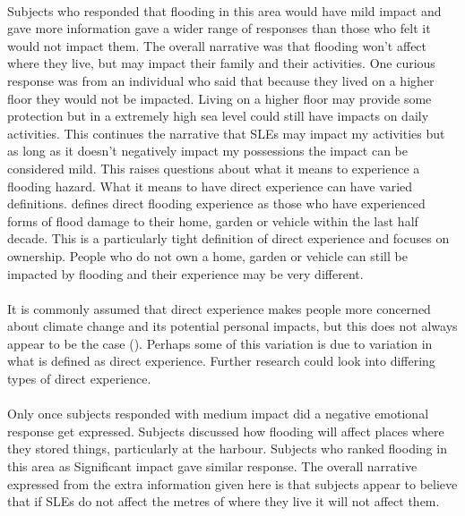 \paragraph{}

Subjects who responded that flooding in this area would have mild impact and gave more information gave a wider range of responses than those who felt it would not impact them. The overall narrative was that flooding won’t affect where they live, but may impact their family and their activities. One curious response was from an individual who said that because they lived on a higher floor they would not be impacted. Living on a higher floor may provide some protection but in a extremely high sea level could still have impacts on daily activities. This continues the narrative that SLEs may impact my activities but as long as it doesn't negatively impact my possessions the impact can be considered mild. This raises questions about what it means to experience a flooding hazard. What it means to have direct experience can have varied definitions. 
\cite{whitmarsh_are_2008} defines direct flooding experience as those who have experienced forms of flood damage to their home, garden or vehicle within the last half decade. This is a particularly tight definition of direct experience and focuses on ownership. People who do not own a home, garden or vehicle can still be impacted by flooding and their experience may be very different.  
\paragraph{}
It is commonly assumed that direct experience makes people more concerned about climate change and its potential personal impacts, but this does not always appear to be the case (\cite{lujala_role_2020}). Perhaps some of this variation is due to variation in what is defined as direct experience. Further research could look into differing types of direct experience. 
\paragraph{}
Only once subjects responded with medium impact did a negative emotional response get expressed. Subjects discussed how flooding will affect places where they stored things, particularly at the harbour. Subjects who ranked flooding in this area as Significant impact gave similar response. The overall narrative expressed from the extra information given here is that subjects appear to believe that if SLEs do not affect the metres of where they live it will not affect them. 
